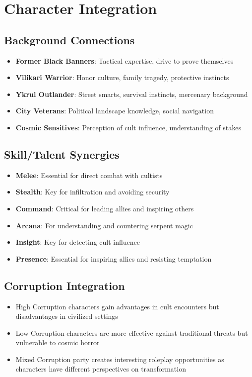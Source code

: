 \documentclass[11pt]{article}
\begin{document}
\newpage

\section{Character Integration}

\subsection{Background Connections}
\begin{itemize}[leftmargin=*]
    \item \textbf{Former Black Banners}: Tactical expertise, drive to prove themselves
    \item \textbf{Vilikari Warrior}: Honor culture, family tragedy, protective instincts
    \item \textbf{Ykrul Outlander}: Street smarts, survival instincts, mercenary background
    \item \textbf{City Veterans}: Political landscape knowledge, social navigation
    \item \textbf{Cosmic Sensitives}: Perception of cult influence, understanding of stakes
\end{itemize}

\subsection{Skill/Talent Synergies}
\begin{itemize}[leftmargin=*]
    \item \textbf{Melee}: Essential for direct combat with cultists
    \item \textbf{Stealth}: Key for infiltration and avoiding security
    \item \textbf{Command}: Critical for leading allies and inspiring others
    \item \textbf{Arcana}: For understanding and countering serpent magic
    \item \textbf{Insight}: Key for detecting cult influence
    \item \textbf{Presence}: Essential for inspiring allies and resisting temptation
\end{itemize}

\subsection{Corruption Integration}
\begin{itemize}[leftmargin=*]
    \item High Corruption characters gain advantages in cult encounters but disadvantages in civilized settings
    \item Low Corruption characters are more effective against traditional threats but vulnerable to cosmic horror
    \item Mixed Corruption party creates interesting roleplay opportunities as characters have different perspectives on transformation
\end{itemize}
\end{document}
